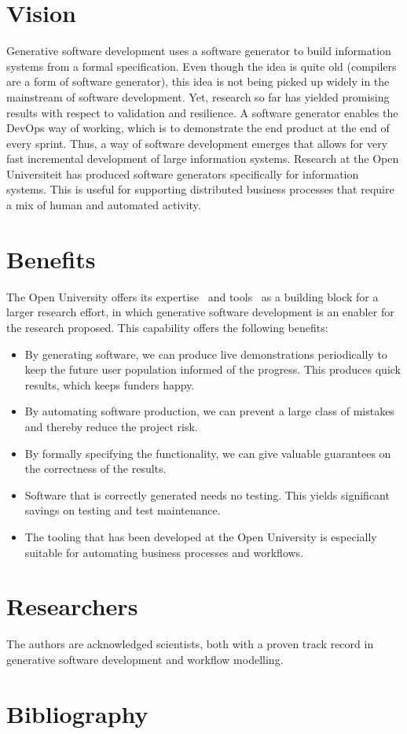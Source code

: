 \documentclass{elsarticle}
\begin{document}
\section{Vision}
   Generative software development uses a software generator to build information systems from a formal specification.
   Even though the idea is quite old (compilers are a form of software generator),
   this idea is not being picked up widely in the mainstream of software development.
   Yet, research so far has yielded promising results with respect to validation and resilience.
   A software generator enables the DevOps way of working, which is to demonstrate the end product at the end of every sprint.
   Thus, a way of software development emerges that allows for very fast incremental development of large information systems.
   Research at the Open Universiteit has produced software generators specifically for information systems.
   This is useful for supporting distributed business processes that require a mix of human and automated activity.

\section{Benefits}
    The Open University offers its expertise~\cite{JoostenRAMiCS2017,Steenvoorden2022} and tools~\cite{Joosten-JLAMP2018,10.1145/3354166.3354182}
    as a building block for a larger research effort,
    in which generative software development is an enabler for the research proposed.
    This capability offers the following benefits:
\begin{itemize}
    \item By generating software, we can produce live demonstrations periodically to keep the future user population informed of the progress.
    This produces quick results, which keeps funders happy.
    \item By automating software production, we can prevent a large class of mistakes and thereby reduce the project risk.
    \item By formally specifying the functionality, we can give valuable guarantees on the correctness of the results.
    \item Software that is correctly generated needs no testing. This yields significant savings on testing and test maintenance.
    \item The tooling that has been developed at the Open University is especially suitable for automating business processes and workflows.
\end{itemize}

\section{Researchers}
    The authors are acknowledged scientists, both with a proven track record in generative software development and workflow modelling.

\newpage

\section{Bibliography}
    
    
\end{document}
